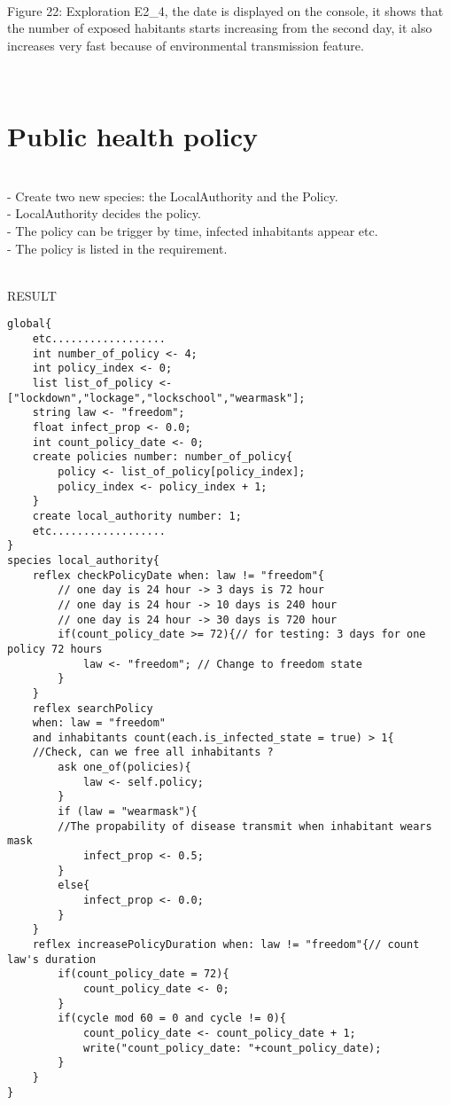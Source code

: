 \documentclass{article}
\begin{document}
\begin{pic15}
\begin{pic15}
\begin{pic21}
\end{pic21}
\\\\
\begin{pic22}
\\
\caption{Figure 22: Exploration E2\_4, the date is displayed on the console, it shows that the number of exposed habitants starts increasing from the second day, it also increases very fast because of environmental transmission feature.} 
\end{pic22}
\\
\section{Public health policy}
\\- Create two new species: the LocalAuthority and the Policy.
\\- LocalAuthority decides the policy.
\\- The policy can be trigger by time, infected inhabitants appear etc.
\\- The policy is listed in the requirement.

\\RESULT
\\
\begin{lstlisting}
global{
	etc..................
	int number_of_policy <- 4;
	int policy_index <- 0;
	list list_of_policy <- ["lockdown","lockage","lockschool","wearmask"];
	string law <- "freedom";
	float infect_prop <- 0.0;
	int count_policy_date <- 0;
	create policies number: number_of_policy{
		policy <- list_of_policy[policy_index];
		policy_index <- policy_index + 1;
	}
	create local_authority number: 1;
	etc..................
}
species local_authority{
	reflex checkPolicyDate when: law != "freedom"{
		// one day is 24 hour -> 3 days is 72 hour
		// one day is 24 hour -> 10 days is 240 hour
		// one day is 24 hour -> 30 days is 720 hour
		if(count_policy_date >= 72){// for testing: 3 days for one policy 72 hours
			law <- "freedom"; // Change to freedom state
		}
	}
	reflex searchPolicy 
	when: law = "freedom" 
	and inhabitants count(each.is_infected_state = true) > 1{
	//Check, can we free all inhabitants ?
		ask one_of(policies){
			law <- self.policy;
		}
		if (law = "wearmask"){
		//The propability of disease transmit when inhabitant wears mask
			infect_prop <- 0.5; 
		}
		else{
			infect_prop <- 0.0;
		}
	}
	reflex increasePolicyDuration when: law != "freedom"{// count law's duration
		if(count_policy_date = 72){
			count_policy_date <- 0;
		}
		if(cycle mod 60 = 0 and cycle != 0){
			count_policy_date <- count_policy_date + 1;
			write("count_policy_date: "+count_policy_date);
		}
	}
}


\end{lstlisting}
\end{pic15}
\end{pic15}
\end{document}
